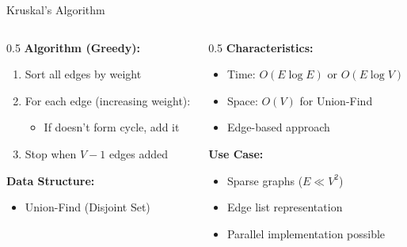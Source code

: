 \documentclass[aspectratio=169,xcolor=dvipsnames]{beamer}
\begin{document}
\begin{frame}{Kruskal's Algorithm}
  \begin{columns}
    \begin{column}{0.5\textwidth}
      \textbf{Algorithm (Greedy):}
      \begin{enumerate}
        \item Sort all edges by weight
        \item For each edge (increasing weight):
        \begin{itemize}
          \item If doesn't form cycle, add it
        \end{itemize}
        \item Stop when $V-1$ edges added
      \end{enumerate}

      \vspace{0.3cm}
      \textbf{Data Structure:}
      \begin{itemize}
        \item Union-Find (Disjoint Set)
      \end{itemize}
    \end{column}

    \begin{column}{0.5\textwidth}
      \textbf{Characteristics:}
      \begin{itemize}
        \item Time: $O(E \log E)$ or $O(E \log V)$
        \item Space: $O(V)$ for Union-Find
        \item Edge-based approach
      \end{itemize}

      \vspace{0.3cm}
      \textbf{Use Case:}
      \begin{itemize}
        \item Sparse graphs ($E \ll V^2$)
        \item Edge list representation
        \item Parallel implementation possible
      \end{itemize}
    \end{column}
  \end{columns}
\end{frame}
\end{document}
